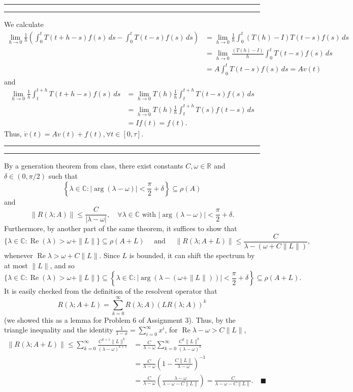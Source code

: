 \documentclass[11pt]{article}
\newcounter{questionCounter}
\newcounter{partCounter}[questionCounter]
\newenvironment{question}[2][\arabic{questionCounter}]{%
    \setcounter{partCounter}{0}%
    \vspace{.25in} \hrule \vspace{0.5em}%
        \noindent{\bf #2}%
    \vspace{0.8em} \hrule \vspace{.10in}%
    \addtocounter{questionCounter}{1}%
}{}
\renewcommand{\qed}{\quad \ensuremath{\blacksquare}}
\newcommand{\inv}{^{-1}}
\newcommand{\R}{\mathbb{R}}             %
\newcommand{\C}{\mathbb{C}}             %
\renewcommand{\Re}{\operatorname{Re}}   %
\begin{document}
\begin{question}{Problem 1}
We calculate
\begin{align*}
\lim_{h \to 0} \frac{1}{h} \left( \int_0^t T(t + h - s) f(s) \, ds
 - \int_0^t T(t - s) f(s) \, ds \right)
 &  = \lim_{h \to 0} \frac{1}{h} \int_0^t (T(h) - I) T(t - s) f(s) \, ds    \\
 &  = \lim_{h \to 0} \frac{(T(h) - I)}{h} \int_0^t T(t - s) f(s) \, ds      \\
 &  = A \int_0^t T(t - s) f(s) \, ds = Av(t)
\end{align*}
and
\begin{align*}
\lim_{h \to 0} \frac{1}{h} \int_t^{t + h} T(t + h - s) f(s) \, ds
 &  = \lim_{h \to 0} T(h) \frac{1}{h} \int_t^{t + h} T(t - s) f(s) \, ds    \\
 &  = \lim_{h \to 0} T(h) \frac{1}{h} \int_t^{t + h} T(s) f(t - s) \, ds    \\
 &  = I f(t) = f(t).
\end{align*}
Thus, $\dot v(t) = Av(t) + f(t), \forall t \in [0,\tau]$.
\end{question}

\begin{question}{Problem 2}
By a generation theorem from class, there exist constants $C,\omega \in \R$ and
$\delta \in (0,\pi/2)$ such that
\[\left\{\lambda \in \C
            : |\arg(\lambda - \omega)| < \frac{\pi}{2} + \delta\right\}
    \subseteq \rho(A)\]
and
\[\|R(\lambda;A)\|
    \leq \frac{C}{|\lambda - \omega|},
    \quad \forall \lambda \in \C
            \mbox{ with } |\arg(\lambda - \omega)| < \frac{\pi}{2} + \delta.
\]
Furthermore, by another part of the same theorem, it suffices to show that
\[\{\lambda \in \C : \Re(\lambda) > \omega + \|L\|\}
    \subseteq \rho(A + L)
\quad \mbox{ and } \quad
\|R(\lambda;A + L)\| \leq \frac{C}{\lambda - (\omega + C\|L\|)},\]
whenever $\Re \lambda > \omega + C\|L\|$.
Since $L$ is bounded, it can shift the spectrum by at most $\|L\|$, and so
\[
\{\lambda \in \C : \Re(\lambda) > \omega + \|L\|\}
    \subseteq \left\{\lambda \in \C
        : |\arg(\lambda - (\omega + \|L\|))| < \frac{\pi}{2} + \delta\right\}
    \subseteq \rho(A + L).
\]
It is easily checked from the definition of the resolvent operator that
\[R(\lambda; A + L)
    = \sum_{k = 0}^\infty R(\lambda; A) \left( LR(\lambda; A) \right)^k
\]
(we showed this as a lemma for Problem 6 of Assignment 3). Thus, by the
triangle inequality and the identity $\frac1{1 - x} = \sum_{i = 0}^\infty x^i$,
for $\Re \lambda - \omega > C\|L\|$,
\begin{align*}
\|R(\lambda; A + L)\|
    \leq \sum_{k = 0}^\infty \frac{C^{k + 1}\|L\|^k}
                                            {(\lambda - \omega)^{k + 1}}
 &  = \frac{C}{\lambda - \omega} \sum_{k = 0}^\infty \frac{C^k\|L\|^k}
                                                    {(\lambda - \omega)^k}  \\
 &  = \frac{C}{\lambda - \omega}
                    \left( 1 - \frac{C\|L\|}{\lambda - \omega} \right)\inv  \\
 &  = \frac{C}{\lambda - \omega}
        \left( \frac{\lambda - \omega}{\lambda - \omega - C\|L\|} \right)
    = \frac{C}{\lambda - \omega - C\|L\|}. \qed
\end{align*}
\end{question}
\end{document}
